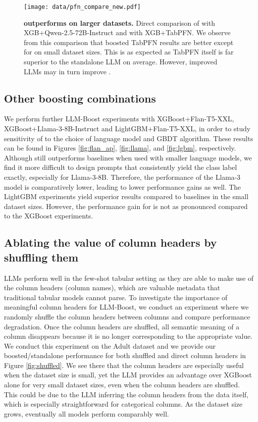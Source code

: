 \begin{figure}[h]
    \centering
    {{\texttt{[image: data/pfn\_compare\_new.pdf]}}}%
    \caption{\textbf{\methodnamepfn outperforms \methodname on larger datasets.} Direct comparison of \methodname with XGB+Qwen-2.5-72B-Instruct and \methodnamepfn with XGB+TabPFN. We observe from this comparison that boosted TabPFN results are better except for on small dataset sizes. This is as expected as TabPFN itself is far superior to the standalone LLM on average. However, improved LLMs may in turn improve \methodname.} %
    \label{fig:pfn_compare}%
\end{figure}


\subsection{Other boosting combinations}
We perform further LLM-Boost experiments with XGBoost+Flan-T5-XXL, XGBoost+Llama-3-8B-Instruct and LightGBM+Flan-T5-XXL, in order to study sensitivity of \methodname to the choice of language model and GBDT algorithm. These results can be found in Figures \ref{fig:flan_ap}, \ref{fig:llama}, and \ref{fig:lgbm}, respectively. Although \methodname still outperforms baselines when used with smaller language models, we find it more difficult to design prompts that consistently yield the class label exactly, especially for Llama-3-8B. Therefore, the performance of the Llama-3 model is comparatively lower, leading to lower \methodname performance gains as well. The LightGBM experiments yield superior results compared to baselines in the small dataset sizes. However, the performance gain for \methodname is not as pronounced compared to the XGBoost experiments. 

\subsection{Ablating the value of column headers by shuffling them}
LLMs perform well in the few-shot tabular setting as they are able to make use of the column headers (column names), which are valuable metadata that traditional tabular models cannot parse. To investigate the importance of meaningful column headers for LLM-Boost, we conduct an experiment where we randomly shuffle the column headers between columns and compare performance degradation. Once the column headers are shuffled, all semantic meaning of a column disappears because it is no longer corresponding to the appropriate value. We conduct this experiment on the Adult dataset and we provide our boosted/standalone performance for both shuffled and direct column headers in Figure \ref{fig:shuffled}.  We see there that the column headers are especially useful when the dataset size is small, yet the LLM provides an advantage over XGBoost alone for very small dataset sizes, even when the column headers are shuffled. This could be due to the LLM inferring the column headers from the data itself, which is especially straightforward for categorical columns. As the dataset size grows, eventually all models perform comparably well.

